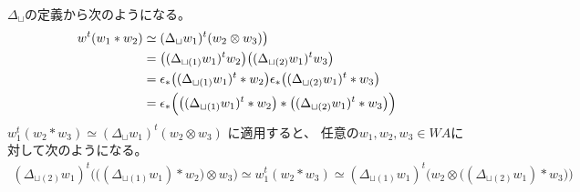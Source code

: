 	$\Delta_\sqcup$の定義から次のようになる。
	\begin{equation*}\begin{split} %
		w^t(w_1*w_2) &\simeq (\Delta_\sqcup w_1)^t(w_2\otimes w_3)\bigr) \\
		&= \bigl((\Delta_{\sqcup(1)}w_1)^tw_2\bigr)
			\bigl((\Delta_{\sqcup(2)}w_1)^tw_3\bigr) \\
		&= \epsilon_*\bigl((\Delta_{\sqcup(1)}w_1)^t*w_2\bigr)
			\epsilon_*\bigl((\Delta_{\sqcup(2)}w_1)^t*w_3\bigr) \\
		&= \epsilon_*\Bigl(\bigl((\Delta_{\sqcup(1)}w_1)^t*w_2\bigr)
			*\bigl((\Delta_{\sqcup(2)}w_1)^t*w_3\bigr)\Bigr)
	\end{split}\end{equation*} %
	$w_1^t(w_2*w_3)\simeq (\Delta_\sqcup w_1)^t(w_2\otimes w_3)$
	に適用すると、 任意の$w_1,w_2,w_3\in WA$に対して次のようになる。
	\begin{equation*}\begin{split} %
		(\Delta_{\sqcup(2)}w_1)^t\biggl(\bigl((\Delta_{\sqcup(1)}w_1)*w_2\bigr)\otimes w_3\biggr)
		\simeq w_1^t(w_2*w_3)
		\simeq (\Delta_{\sqcup(1)}w_1)^t\biggl(w_2\otimes \bigl((\Delta_{\sqcup(2)}w_1)*w_3\bigr)\biggr)
	\end{split}\end{equation*} %
